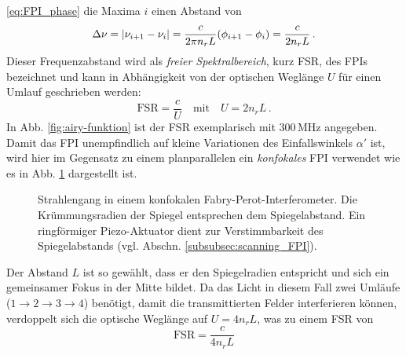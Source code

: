 \eqref{eq:FPI_phase} die Maxima $i$ einen Abstand von
\begin{equation}\label{eq:FPI_transmissionsmaxima}
	\Delta\nu=\left|\nu_{i+1}-\nu_i\right|=\frac{c}{2\pi	n_rL}(\phi_{i+1}-\phi_i)=\frac{c}{2n_rL}\,.
\end{equation}
Dieser Frequenzabstand wird als \textit{freier Spektralbereich}, kurz FSR, des
FPIs bezeichnet und kann in Abhängigkeit von der optischen Weglänge $U$ für
einen Umlauf geschrieben werden:
\begin{equation}\label{eq:FPI_FSR_01}
	\text{FSR}=\frac{c}{U}
	\quad\text{mit}\quad
	U=2n_rL\,.
\end{equation}
In Abb. \ref{fig:airy-funktion} ist der FSR exemplarisch mit $300\,$MHz
angegeben. Damit das FPI unempfindlich auf kleine Variationen des Einfallswinkels $\alpha'$
ist, wird hier im Gegensatz zu einem planparallelen ein \textit{konfokales} FPI
verwendet wie es in Abb. \ref{fig:FPI_konfokal} dargestellt ist.
\begin{figure}[h]
 	\centering
	\caption[FPI - konfokal]{Strahlengang in einem
	konfokalen Fabry-Perot-Interferometer. Die
	Krümmungsradien der Spiegel entsprechen dem
	Spiegelabstand. Ein ringförmiger Piezo-Aktuator dient zur
	Verstimmbarkeit des Spiegelabstands (vgl. Abschn.
	\ref{subsubsec:scanning_FPI}).}
	\label{fig:FPI_konfokal}
\end{figure}
Der Abstand $L$ ist so gewählt, dass er den Spiegelradien entspricht und sich
ein gemeinsamer Fokus in der Mitte bildet. Da das Licht
in diesem Fall zwei Umläufe ($1\rightarrow2\rightarrow3\rightarrow4$)
benötigt, damit die transmittierten Felder interferieren können,
verdoppelt sich die optische Weglänge auf $U=4n_rL$, was zu einem FSR von
\begin{equation}\label{eq:FPI_FSR_02}
	\text{FSR}=\frac{c}{4n_rL}
\end{equation}
